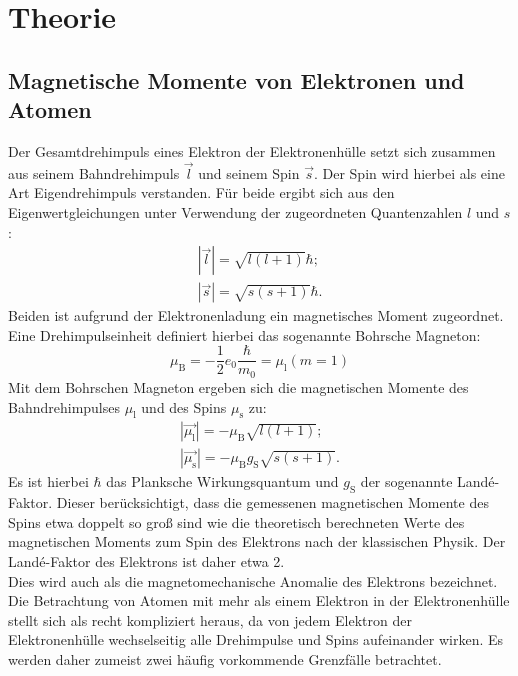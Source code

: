 \section{Theorie}
\label{sec:Theorie}
\subsection{Magnetische Momente von Elektronen und Atomen}
Der Gesamtdrehimpuls eines Elektron der Elektronenhülle setzt sich zusammen aus seinem Bahndrehimpuls $\vec{l}$ und seinem Spin $\vec{s}$.
Der Spin wird hierbei als eine Art Eigendrehimpuls verstanden.
Für beide ergibt sich aus den Eigenwertgleichungen unter Verwendung der zugeordneten Quantenzahlen $l$ und $s$:
\begin{gather}
  |\vec{l}|=\sqrt{l\left(l+1\right)}\hbar \mathrm{;}\\
  |\vec{s}|=\sqrt{s\left(s+1\right)}\hbar \mathrm{.}
\end{gather}
Beiden ist aufgrund der Elektronenladung ein magnetisches Moment zugeordnet.\\
Eine Drehimpulseinheit definiert hierbei das sogenannte Bohrsche Magneton:
\begin{equation}
  \mu_{\mathrm{B}}=-\frac{1}{2}e_0\frac{\hbar}{m_0}=\mu_{\mathrm{l}}(m=1)
\end{equation}
Mit dem Bohrschen Magneton ergeben sich die magnetischen Momente des Bahndrehimpulses $\mu_{\mathrm{l}}$ und des Spins $\mu_{\mathrm{s}}$ zu:
\begin{gather}
  |\vec{\mu_{\mathrm{l}}}|=-\mu_{\mathrm{B}}\sqrt{l\left(l+1\right)}\mathrm{;}\\
  |\vec{\mu_{\mathrm{s}}}|=-\mu_{\mathrm{B}}g_{\mathrm{S}}\sqrt{s\left(s+1\right)}\mathrm{.}
\end{gather}
Es ist hierbei $\hbar$ das Planksche Wirkungsquantum und $g_{\mathrm{S}}$ der sogenannte Landé-Faktor. Dieser berücksichtigt, dass die gemessenen magnetischen Momente des Spins
etwa doppelt so groß sind wie die theoretisch berechneten Werte des magnetischen Moments zum Spin des Elektrons nach der klassischen Physik. Der Landé-Faktor des Elektrons ist daher etwa 2. \\
Dies wird auch als die magnetomechanische Anomalie des Elektrons bezeichnet.\\
Die Betrachtung von Atomen mit mehr als einem Elektron in der Elektronenhülle stellt sich als recht kompliziert heraus, da von jedem Elektron der Elektronenhülle
wechselseitig alle Drehimpulse und Spins aufeinander wirken. Es werden daher zumeist zwei häufig vorkommende Grenzfälle betrachtet.
